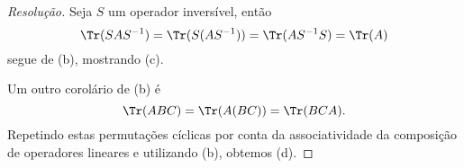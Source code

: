 \begin{proof}[Resolução]
    Seja \(S\) um operador inversível, então
    \begin{equation*}
        \Tr(SAS^{-1}) = \Tr(S(AS^{-1})) = \Tr(AS^{-1}S) = \Tr(A)
    \end{equation*}
    segue de (b), mostrando (c).

    Um outro corolário de (b) é
    \begin{equation*}
        \Tr(ABC) = \Tr(A(BC)) = \Tr(BCA).
    \end{equation*}
    Repetindo estas permutações cíclicas por conta da associatividade da composição de operadores lineares e utilizando (b), obtemos (d).
\end{proof}
